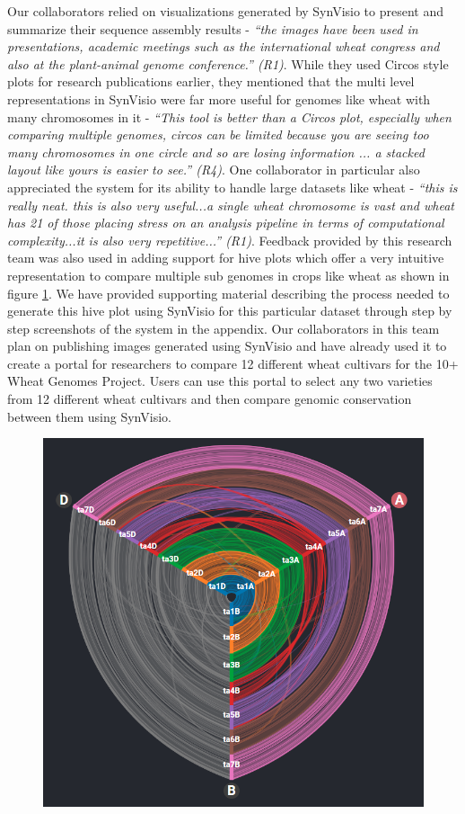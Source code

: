Our collaborators relied on visualizations generated by SynVisio to present and summarize their sequence assembly results - \textit{``the images have been used in presentations, academic meetings such as the international wheat congress and also at the plant-animal genome conference.'' (R1)}. While they used Circos style plots for research publications earlier, they mentioned that the multi level representations in SynVisio were far more useful for genomes like wheat with many chromosomes in it - \textit{``This tool is better than a Circos plot, especially when comparing multiple genomes, circos can be limited because you are seeing too many chromosomes in one circle and so are losing information ... a stacked layout like yours is easier to see.'' (R4)}. One collaborator in particular also appreciated the system for its ability to handle large datasets like wheat - \textit{``this is really neat. this is also very useful...a single wheat chromosome is vast and wheat has 21 of those placing stress on an analysis pipeline in terms of computational complexity...it is also very repetitive...'' (R1)}.
Feedback provided by this research team was also used in adding support for hive plots which offer a very intuitive representation to compare multiple sub genomes in crops like wheat as shown in figure \ref{fig:ch_6_wheat}. We have provided supporting material describing the process needed to generate this hive plot using SynVisio for this particular dataset through step by step screenshots of the system in the appendix. Our collaborators in this team plan on publishing images generated using SynVisio and have already used it to create a portal for researchers to compare 12 different wheat cultivars for the 10+ Wheat Genomes Project. Users can use this portal to select any two varieties from 12 different wheat cultivars and then compare genomic conservation between them using SynVisio\cite{10wheat,wheatinfogithub}.

\begin{figure}
  \centering
  \includegraphics[width=0.65\linewidth]{images/ch_6_wheat.PNG}
  \label{fig:ch_6_wheat}
\end{figure}


